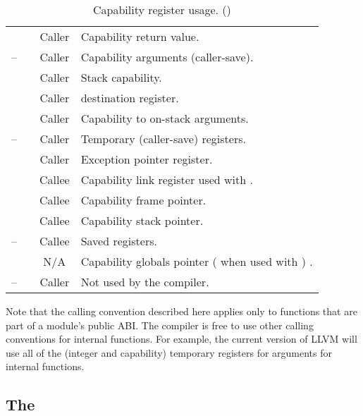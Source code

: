 \begin{table}
\begin{center}
\begin{tabu}{lccX}
			             &                     & Caller & Capability return value. \\
			--  &                     & Caller & Capability arguments (caller-save). \\
			            &            & Caller & Stack capability. \\
			            &                     & Caller &  destination register. \\
			            &                     & Caller & Capability to on-stack arguments. \\
			-- &                     & Caller & Temporary (caller-save) registers.\\
			            &                     & Caller & Exception pointer register. \\
			            &            & Callee & Capability link register used with .\\
			            &            & Callee & Capability frame pointer.\\
			            &            & Callee & Capability stack pointer.\\
			-- &                     & Callee & Saved registers. \\
			            &            & N/A & Capability globals pointer ( when used with ) .\\
			-- &                     & Caller & Not used by the compiler.\\
			\bottomrule
		\end{tabu}
		\caption{\label{tbl:purecapreguse}Capability register usage. (\purecapABI)}
	\end{center}
\end{table}



Note that the calling convention described here applies only to functions that are part of a module's public ABI.
The compiler is free to use other calling conventions for internal functions.
For example, the current version of LLVM will use all of the (integer and
capability) temporary registers for arguments for internal functions.

\subsection{The \purecapABI{}}

